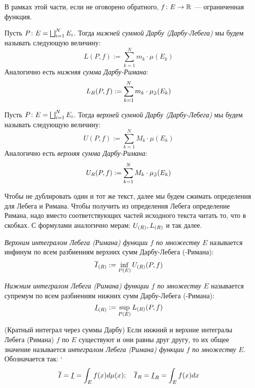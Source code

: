 \begin{note}
	В рамках этой части, если не оговорено обратного, $f \colon E \to \mathbb{R}$ --- ограниченная функция.
\end{note}

\begin{definition}
	Пусть $P \colon E = \bigsqcup_{i = 1}^N E_i$. Тогда \textit{нижней суммой Дарбу (Дарбу-Лебега)} мы будем называть следующую величину:
	\[
		L(P, f) := \sum_{k = 1}^N m_k \cdot \mu(E_k)
	\]
	Аналогично есть \textit{нижняя сумма Дарбу-Римана}:
	\[
		L_R(P, f) := \sum_{k = 1}^N m_k \cdot \operatorname{\mu_\mathfrak{J}}(E_k)
	\]
\end{definition}

\begin{definition}
	Пусть $P \colon E = \bigsqcup_{i = 1}^N E_i$. Тогда \textit{верхней суммой Дарбу (Дарбу-Лебега)} мы будем называть следующую величину:
	\[
	U(P, f) := \sum_{k = 1}^N M_k \cdot \mu(E_k)
	\]
	Аналогично есть \textit{верхняя сумма Дарбу-Римана}:
	\[
	U_R(P, f) := \sum_{k = 1}^N M_k \cdot \operatorname{\mu_\mathfrak{J}}(E_k)
	\]
\end{definition}

\begin{note}
	Чтобы не дублировать один и тот же текст, далее мы будем сжимать определения для Лебега и Римана. Чтобы получить из определения Лебега определение Римана, надо вместо соответствующих частей исходного текста читать то, что в скобках. С формулами аналогично мерам: $U_{(R)}, L_{(R)}$ и так далее.
\end{note}

\begin{definition}
	\textit{Верхним интегралом Лебега (Римана) функции $f$ по множеству $E$} называется инфинум по всем разбиениям верхних сумм Дарбу-Лебега (-Римана):
	\[
		\overline{I}_{(R)} := \inf_{P(E)} U_{(R)}(P, f)
	\]
\end{definition}

\begin{definition}
	\textit{Нижним интегралом Лебега (Римана) функции $f$ по множеству $E$} называется супремум по всем разбиениям нижних сумм Дарбу-Лебега (-Римана):
	\[
		\underline{I}_{(R)} := \sup_{P(E)} L_{(R)}(P, f)
	\]
\end{definition}

\begin{definition} (Кратный интеграл через суммы Дарбу)
	Если нижний и верхние интегралы Лебега (Римана) $f$ по $E$ существуют и они равны друг другу, то их общее значение называется \textit{интегралом Лебега (Римана) функции $f$ по множеству $E$}. Обозначается так:
`	\[
		\overline{I} = \underline{I} = \int_E f(x) d\mu(x); \quad \overline{I}_R = \underline{I}_R = \int_E f(x)dx
	\]
\end{definition}

